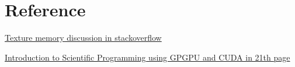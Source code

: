 \documentclass{article}
\begin{document}
	\section{Reference}
	\href{https://stackoverflow.com/questions/8767059/texture-memory-in-cuda-concept-and-simple-example-to-demonstrate-performance}{Texture memory discussion in stackoverflow}
	
	\href{https://materials.prace-ri.eu/448/3/ISPGC15lect3.pdf}{Introduction to Scientific Programming using GPGPU and CUDA
in 21th page}
\end{document}
